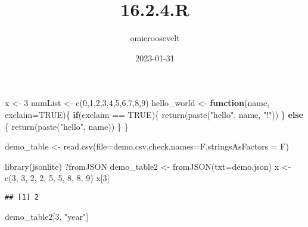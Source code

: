 \documentclass[
]{article}
\title{16.2.4.R}
\author{omieroosevelt}
\date{2023-01-31}
\newenvironment{Shaded}{\begin{snugshade}}{\end{snugshade}}
\newcommand{\AttributeTok}[1]{\textcolor[rgb]{0.77,0.63,0.00}{#1}}
\newcommand{\ConstantTok}[1]{\textcolor[rgb]{0.00,0.00,0.00}{#1}}
\newcommand{\ControlFlowTok}[1]{\textcolor[rgb]{0.13,0.29,0.53}{\textbf{#1}}}
\newcommand{\DecValTok}[1]{\textcolor[rgb]{0.00,0.00,0.81}{#1}}
\newcommand{\FunctionTok}[1]{\textcolor[rgb]{0.00,0.00,0.00}{#1}}
\newcommand{\NormalTok}[1]{#1}
\newcommand{\OtherTok}[1]{\textcolor[rgb]{0.56,0.35,0.01}{#1}}
\newcommand{\SpecialCharTok}[1]{\textcolor[rgb]{0.00,0.00,0.00}{#1}}
\newcommand{\StringTok}[1]{\textcolor[rgb]{0.31,0.60,0.02}{#1}}
\begin{document}
\maketitle

\begin{Shaded}
\begin{Highlighting}[]
\NormalTok{x }\OtherTok{\textless{}{-}} \DecValTok{3}
\NormalTok{numList }\OtherTok{\textless{}{-}} \FunctionTok{c}\NormalTok{(}\DecValTok{0}\NormalTok{,}\DecValTok{1}\NormalTok{,}\DecValTok{2}\NormalTok{,}\DecValTok{3}\NormalTok{,}\DecValTok{4}\NormalTok{,}\DecValTok{5}\NormalTok{,}\DecValTok{6}\NormalTok{,}\DecValTok{7}\NormalTok{,}\DecValTok{8}\NormalTok{,}\DecValTok{9}\NormalTok{)}
\NormalTok{hello\_world }\OtherTok{\textless{}{-}} \ControlFlowTok{function}\NormalTok{(name, }\AttributeTok{exclaim=}\ConstantTok{TRUE}\NormalTok{)\{}
  \ControlFlowTok{if}\NormalTok{(exclaim }\SpecialCharTok{==} \ConstantTok{TRUE}\NormalTok{)\{}
    \FunctionTok{return}\NormalTok{(}\FunctionTok{paste}\NormalTok{(}\StringTok{"hello"}\NormalTok{, name, }\StringTok{"!"}\NormalTok{))}
\NormalTok{  \} }\ControlFlowTok{else}\NormalTok{ \{}
  \FunctionTok{return}\NormalTok{(}\FunctionTok{paste}\NormalTok{(}\StringTok{"hello"}\NormalTok{, name))}
\NormalTok{  \}}
\NormalTok{\}}

\NormalTok{demo\_table }\OtherTok{\textless{}{-}} \FunctionTok{read.csv}\NormalTok{(}\AttributeTok{file=}\StringTok{\textquotesingle{}demo.csv\textquotesingle{}}\NormalTok{,}\AttributeTok{check.names=}\NormalTok{F,}\AttributeTok{stringsAsFactors =}\NormalTok{ F)}

\FunctionTok{library}\NormalTok{(jsonlite)}
\NormalTok{?fromJSON}
\NormalTok{demo\_table2 }\OtherTok{\textless{}{-}} \FunctionTok{fromJSON}\NormalTok{(}\AttributeTok{txt=}\StringTok{\textquotesingle{}demo.json\textquotesingle{}}\NormalTok{)}
\NormalTok{x }\OtherTok{\textless{}{-}} \FunctionTok{c}\NormalTok{(}\DecValTok{3}\NormalTok{, }\DecValTok{3}\NormalTok{, }\DecValTok{2}\NormalTok{, }\DecValTok{2}\NormalTok{, }\DecValTok{5}\NormalTok{, }\DecValTok{5}\NormalTok{, }\DecValTok{8}\NormalTok{, }\DecValTok{8}\NormalTok{, }\DecValTok{9}\NormalTok{)}
\NormalTok{x[}\DecValTok{3}\NormalTok{]}
\end{Highlighting}
\end{Shaded}

\begin{verbatim}
## [1] 2
\end{verbatim}

\begin{Shaded}
\begin{Highlighting}[]
\NormalTok{demo\_table2[}\DecValTok{3}\NormalTok{, }\StringTok{"year"}\NormalTok{]}
\end{Highlighting}
\end{Shaded}
\end{document}
